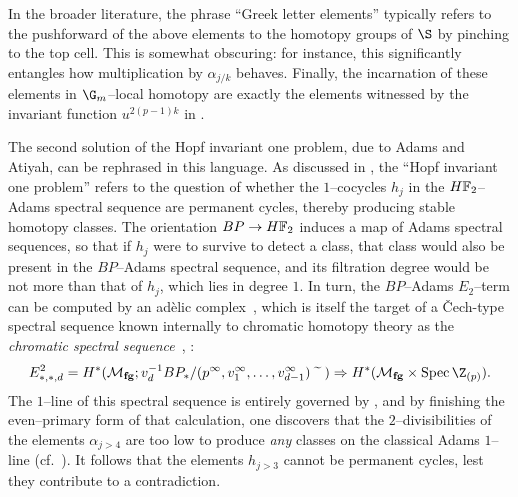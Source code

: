 \begin{remark}\label{GreekLetterElements}
In the broader literature, the phrase ``Greek letter elements'' typically refers to the pushforward of the above elements to the homotopy groups of \(\S\) by pinching to the top cell.  This is somewhat obscuring: for instance, this significantly entangles how multiplication by \(\alpha_{j/k}\) behaves.  Finally, the incarnation of these elements in \(\G_m\)--local homotopy are exactly the elements witnessed by the invariant function \(u^{2(p-1)k}\) in .
\end{remark}

\begin{remark}
The second solution of the Hopf invariant one problem, due to Adams and Atiyah, can be rephrased in this language.  As discussed in , the ``Hopf invariant one problem'' refers to the question of whether the \(1\)--cocycles \(h_j\) in the \(\HFtwo\)--Adams spectral sequence are permanent cycles, thereby producing stable homotopy classes.  The orientation \(BP \to \HFtwo\) induces a map of Adams spectral sequences, so that if \(h_j\) were to survive to detect a class, that class would also be present in the \(BP\)--Adams spectral sequence, and its filtration degree would be not more than that of \(h_j\), which lies in degree \(1\).  In turn, the \(BP\)--Adams \(E_2\)--term can be computed by an ad\`elic complex~\cite{BeilinsonAdeles,Huber}, which is itself the target of a \v{C}ech-type spectral sequence known internally to chromatic homotopy theory as the \textit{chromatic spectral sequence}~\cite[Section 3]{MRW}, \cite[Equation 4.60]{Wilson}: \[E^2_{*,*,d} = H^*(\moduli{fg}; v_d^{-1} BP_* / (p^\infty, v_1^\infty, \ldots, v_{d-1}^\infty)\widetilde{\quad}) \Rightarrow H^*(\moduli{fg} \times \Spec \Z_{(p)}).\]  The \(1\)--line of this spectral sequence is entirely governed by , and by finishing the even--primary form of that calculation, one discovers that the \(2\)--divisibilities of the elements \(\alpha_{j > 4}\) are too low to produce \emph{any} classes on the classical Adams \(1\)--line (cf.\ ).  It follows that the elements \(h_{j > 3}\) cannot be permanent cycles, lest they contribute to a contradiction.
\end{remark}

